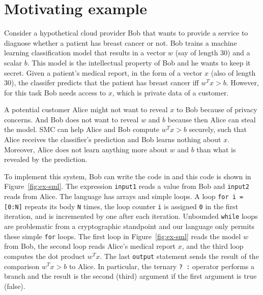 \section{Motivating example}
\label{sec:ex}
Consider a hypothetical cloud provider Bob that wants to provide a service to diagnose
whether a patient has breast cancer or not. Bob trains a machine learning classification model
that results in a vector $w$ (say of length 30) and a scalar $b$.
This model is the intellectual property of Bob and he  wants to keep it secret.
Given a patient's medical report, in the form of a vector $x$ (also of length 30),
the classifer predicts that the patient has breast cancer iff $w^Tx>b$.
However, for this task Bob needs access to $x$, which is private data of a customer.

A potential customer Alice might not want to reveal $x$ to Bob because of privacy concerns.
And Bob does not want to reveal $w$ and $b$ because then Alice can steal the model.
SMC can help Alice and Bob compute $w^Tx>b$ securely, such that Alice receives the classifier's
prediction and Bob learns nothing about $x$. Moreover, Alice does not learn anything more about $w$
and $b$ than what is revealed by the prediction. 

To implement this system, Bob can write the code in \tool and this code is shown in Figure~\ref{fig:ex-sml}.
The expression {\tt input1} reads a value from Bob and {\tt input2} reads from Alice.
The language has arrays and simple loops. A loop {\tt for i = [0:N]} repeats its
body {\tt N} times, the loop counter {\tt i} is assigned {\tt 0} in the first iteration,
and is incremented by one after each iteration. Unbounded {\tt while} loops are problematic
from a cryptographic standpoint and our language only permits these simple {\tt for} loops. 
The first loop in Figure~\ref{fig:ex-sml} reads the model $w$ from Bob, the second loop reads
Alice's medical report $x$, and the third loop computes the dot product $w^Tx$.
The last {\tt output} statement sends the result of the comparison $w^Tx>b$ to Alice.
In particular, the ternary {\tt ? :} operator performs a branch and the result is the second (third)
argument if the first argument is true (false).

